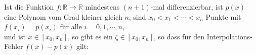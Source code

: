 \begin{Satz} 
  \label{satz:interpolationsFehler}
  Ist die Funktion $f:\mathbb{R} \rightarrow \mathbb{R}$ mindestens $(n+1)$-mal differenzierbar, ist $p(x)$ eine Polynom vom Grad
  kleiner gleich $n$, sind $x_0 < x_1 < \cdots < x_n$ Punkte mit
  \\[0.2cm]
  \hspace*{1.3cm}
  $f(x_i) = p(x_i)$ f\"ur alle $i=0,1,\cdots,n$,
  \\[0.2cm]
  und ist $\bar{x} \in [x_0,x_n]$, so gibt es ein $\zeta\in [x_0,x_n]$, so dass f\"ur
  den Interpolations-Fehler $f(\bar{x}) - p(\bar{x})$ gilt: 
  \\[0.2cm]
  \hspace*{1.3cm}
\colorbox{red}{\colorbox{orange}{}}
\end{Satz}

